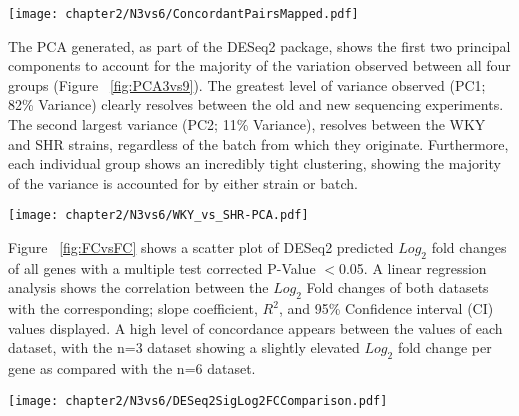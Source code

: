 \begin{figure*}[!htbp]
\centering
\texttt{[image: chapter2/N3vs6/ConcordantPairsMapped.pdf]}
\caption[Mapping levels between n=3 and n=6 RNAseq experiments0]{Levels of Concordantly mapped reads of both n=3 and n=6 run - Comparison between Tophat and \acrshort{star} aligners}
\label{fig:mappingrate}
\end{figure*}

The PCA generated, as part of the DESeq2 package, shows the first two principal components to account for the majority of the variation observed between all four groups (Figure ~\ref{fig:PCA3vs9}). The greatest level of variance observed (PC1; 82\% Variance) clearly resolves between the old and new sequencing experiments. The second largest variance (PC2; 11\% Variance), resolves between the WKY and SHR strains, regardless of the batch from which they originate. Furthermore, each individual group shows an incredibly tight clustering, showing the majority of the variance is accounted for by either strain or batch.

\begin{figure*}[!htbp]
\centering
\texttt{[image: chapter2/N3vs6/WKY\_vs\_SHR-PCA.pdf]}
\caption[PCA Plot featuring Previous n=3 RNAseq and current n=6 RNAseq experiments]{\acrfull{pca} Plot featuring Previous n=3 RNAseq and current n=6 RNAseq experiments. Sample colours are grouped by experiment and strain.}
\label{fig:PCA3vs9}
\end{figure*}

Figure ~\ref{fig:FCvsFC} shows a scatter plot of DESeq2 predicted $Log_{2}$ fold changes of all genes with a multiple test corrected P-Value $<$0.05. A linear regression analysis shows the correlation between the $Log_{2}$ Fold changes of both datasets with the corresponding; slope coefficient, $R^{2}$, and 95\% Confidence interval (CI) values displayed. A high level of concordance appears between the values of each dataset, with the n=3 dataset showing a slightly elevated $Log_{2}$ fold change per gene as compared with the n=6 dataset. \\

\begin{figure*}[!htbp]
\centering
\texttt{[image: chapter2/N3vs6/DESeq2SigLog2FCComparison.pdf]}
\caption[DESeq2 Generated $Log_{2}$ Fold Changes between n=3 and n=6 RNAseq Datasets]{Scatter Graph representation of DESeq2 significant (P-Value$<$0.05) $Log_{2}$ Fold Changes across n=3 and n=6 RNAseq experiments}
\label{fig:FCvsFC}
\end{figure*}

